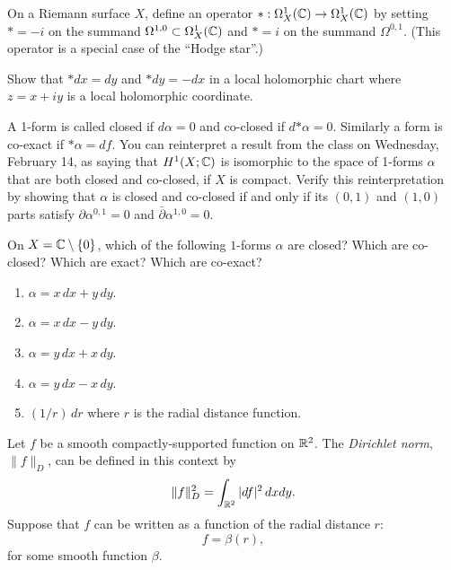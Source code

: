 \documentclass[expanded]{lkx_pset}
\begin{document}
\begin{problem}{3}
On a Riemann surface $X$, define an operator $\mathord{*} :
	\Omega^{1}_{X}(\mathbb{C}) \to \Omega^{1}_{X}(\mathbb{C})$ by setting $\mathord{*}= -i$ on
the summand $\Omega^{1,0}\subset \Omega^{1}_{X}(\mathbb{C})$ and $\mathord{*}=i$ on
the summand $\Omega^{0,1}$. (This operator is a special case of
the ``Hodge star''.)
\end{problem}

\begin{parts}
	\begin{part}{}
		Show that $\mathord{*} dx = dy$ and
		$\mathord{*} dy = -dx$ in a local holomorphic chart where $z=x+iy$
		is a local holomorphic coordinate.
	\end{part}

	\begin{part}{}
		A 1-form is called closed if $d\alpha=0$ and co-closed if $d \mathord{*} \alpha =0$. Similarly a form is co-exact if $*\alpha= df$. You can reinterpret a result from the class on Wednesday,
		February 14, as saying that $H^{1}(X;\mathbb{C})$ is isomorphic to the
		space of 1-forms $\alpha$ that are both closed and co-closed, if $X$ is
		compact. Verify this reinterpretation by showing that $\alpha$ is closed and
		co-closed if and only if its $(0,1)$ and $(1,0)$ parts satisfy $\partial \alpha^{0,1}=0$ and
		$\bar\partial \alpha^{1,0}=0$.
	\end{part}

	\begin{part}{}

		On $X = \mathbb{C}\setminus \{0\}$, which of the following $1$-forms $\alpha$
		are closed? Which are co-closed? Which are exact?
		Which are co-exact?

		\begin{enumerate}
			\item $\alpha=x\, dx + y \, dy$.
			\item $\alpha=x\, dx - y \, dy$.
			\item $\alpha=y\, dx + x \, dy$.
			\item $\alpha=y\, dx - x \, dy$.
			\item $(1/r)\,dr$ where $r$ is the radial distance function.
		\end{enumerate}
	\end{part}
\end{parts}

\begin{problem}{4}
Let $f$ be a smooth compactly-supported function on $\mathbb{R}^{2}$. The
\emph{Dirichlet norm}, $\|f\|_{D}$, can be defined in this context by
\[
	\|f\|_{D}^{2} = \int_{\mathbb{R}^{2}} |df|^{2} \, dxdy.
\]
Suppose that $f$ can be written as a function of the radial
distance $r$:
\[
	f = \beta(r),
\]
for some smooth function $\beta$.
\end{problem}
\end{document}
